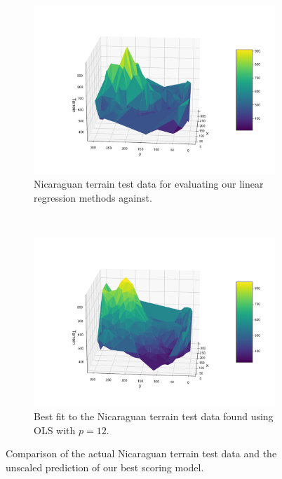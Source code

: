 \documentclass[twocolumn,english,notitlepage]{article}
\begin{document}
        \begin{figure} [H]
            \begin{subfigure}{\linewidth}
                \centering
                \includegraphics[width=\linewidth]{Nica_test_plot.pdf}
                \caption{Nicaraguan terrain test data for evaluating our linear regression methods against.}
                \label{res:subfig:Nica_test}
            \end{subfigure}
            \\
            \begin{subfigure}{\linewidth}
                \centering
                \includegraphics[width=\linewidth]{Nica_predict_plot.pdf}
                \caption{Best fit to the Nicaraguan terrain test data found using OLS with $p=12$.}
                \label{res:subfig:Nica_predict}
            \end{subfigure}
            \caption{Comparison of the actual Nicaraguan terrain test data and the unscaled prediction of our best scoring model.}
        \end{figure}
\end{document}
